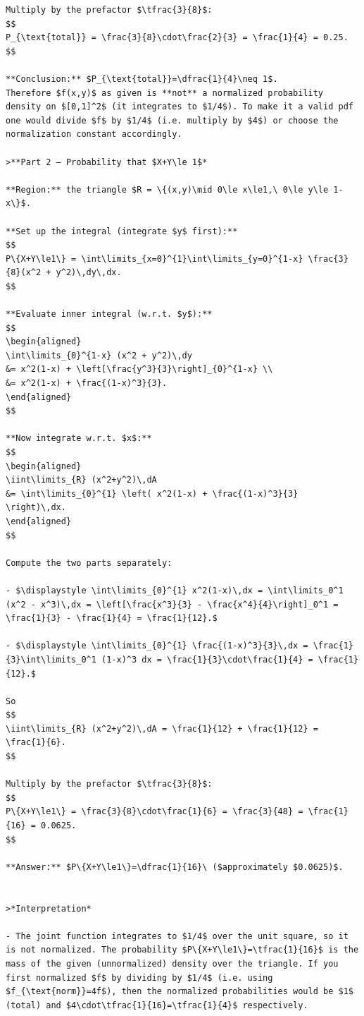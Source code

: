 \documentclass[
  letterpaper,
  DIV=11,
  numbers=noendperiod]{scrreprt}
\begin{document}
\begin{verbatim}
Multiply by the prefactor $\tfrac{3}{8}$:
$$
P_{\text{total}} = \frac{3}{8}\cdot\frac{2}{3} = \frac{1}{4} = 0.25.
$$

**Conclusion:** $P_{\text{total}}=\dfrac{1}{4}\neq 1$.  
Therefore $f(x,y)$ as given is **not** a normalized probability density on $[0,1]^2$ (it integrates to $1/4$). To make it a valid pdf one would divide $f$ by $1/4$ (i.e. multiply by $4$) or choose the normalization constant accordingly.

>**Part 2 — Probability that $X+Y\le 1$*

**Region:** the triangle $R = \{(x,y)\mid 0\le x\le1,\ 0\le y\le 1-x\}$.

**Set up the integral (integrate $y$ first):**
$$
P\{X+Y\le1\} = \int\limits_{x=0}^{1}\int\limits_{y=0}^{1-x} \frac{3}{8}(x^2 + y^2)\,dy\,dx.
$$

**Evaluate inner integral (w.r.t. $y$):**
$$
\begin{aligned}
\int\limits_{0}^{1-x} (x^2 + y^2)\,dy
&= x^2(1-x) + \left[\frac{y^3}{3}\right]_{0}^{1-x} \\
&= x^2(1-x) + \frac{(1-x)^3}{3}.
\end{aligned}
$$

**Now integrate w.r.t. $x$:**
$$
\begin{aligned}
\iint\limits_{R} (x^2+y^2)\,dA
&= \int\limits_{0}^{1} \left( x^2(1-x) + \frac{(1-x)^3}{3} \right)\,dx.
\end{aligned}
$$

Compute the two parts separately:

- $\displaystyle \int\limits_{0}^{1} x^2(1-x)\,dx = \int\limits_0^1 (x^2 - x^3)\,dx = \left[\frac{x^3}{3} - \frac{x^4}{4}\right]_0^1 = \frac{1}{3} - \frac{1}{4} = \frac{1}{12}.$

- $\displaystyle \int\limits_{0}^{1} \frac{(1-x)^3}{3}\,dx = \frac{1}{3}\int\limits_0^1 (1-x)^3 dx = \frac{1}{3}\cdot\frac{1}{4} = \frac{1}{12}.$

So
$$
\iint\limits_{R} (x^2+y^2)\,dA = \frac{1}{12} + \frac{1}{12} = \frac{1}{6}.
$$

Multiply by the prefactor $\tfrac{3}{8}$:
$$
P\{X+Y\le1\} = \frac{3}{8}\cdot\frac{1}{6} = \frac{3}{48} = \frac{1}{16} = 0.0625.
$$

**Answer:** $P\{X+Y\le1\}=\dfrac{1}{16}\ ($approximately $0.0625)$.


>*Interpretation*

- The joint function integrates to $1/4$ over the unit square, so it is not normalized. The probability $P\{X+Y\le1\}=\tfrac{1}{16}$ is the mass of the given (unnormalized) density over the triangle. If you first normalized $f$ by dividing by $1/4$ (i.e. using $f_{\text{norm}}=4f$), then the normalized probabilities would be $1$ (total) and $4\cdot\tfrac{1}{16}=\tfrac{1}{4}$ respectively.



\end{verbatim}
\end{document}
